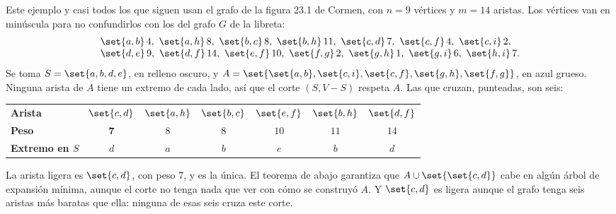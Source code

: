 \documentclass[11pt,letterpaper]{article}
\begin{document}
\begin{ejemplo}
  \label{ej:corte-cormen-mst}
  Este ejemplo y casi todos los que siguen usan el grafo de la figura
  23.1 de Cormen, con $n = 9$ vértices y $m = 14$ aristas. Los
  vértices van en minúscula para no confundirlos con los del grafo
  $G$ de la libreta:
  \[
    \begin{array}{l}
      \set{a,b}\,4,\ \set{a,h}\,8,\ \set{b,c}\,8,\ \set{b,h}\,11,\
      \set{c,d}\,7,\ \set{c,f}\,4,\ \set{c,i}\,2, \\
      \set{d,e}\,9,\ \set{d,f}\,14,\ \set{e,f}\,10,\ \set{f,g}\,2,\
      \set{g,h}\,1,\ \set{g,i}\,6,\ \set{h,i}\,7 .
    \end{array}
  \]
  Se toma $S = \set{a, b, d, e}$, en relleno oscuro, y
  $A = \set{\set{a,b}, \set{c,i}, \set{c,f}, \set{g,h}, \set{f,g}}$,
  en azul grueso. Ninguna arista de $A$ tiene un extremo de cada lado,
  así que el corte $(S, V - S)$ respeta $A$. Las que cruzan,
  punteadas, son seis:
  \begin{center}
  \small
  \begin{tabular}{lcccccc}
    \toprule
    \textbf{Arista} & $\set{c,d}$ & $\set{a,h}$ & $\set{b,c}$
      & $\set{e,f}$ & $\set{b,h}$ & $\set{d,f}$ \\
    \textbf{Peso} & $\mathbf{7}$ & $8$ & $8$ & $10$ & $11$ & $14$ \\
    \textbf{Extremo en $S$} & $d$ & $a$ & $b$ & $e$ & $b$ & $d$ \\
    \bottomrule
  \end{tabular}
  \end{center}
  La arista ligera es $\set{c, d}$, con peso $7$, y es la única. El
  teorema de abajo garantiza que $A \cup \set{\set{c, d}}$ cabe en
  algún árbol de expansión mínima, aunque el corte no tenga nada que
  ver con cómo se construyó $A$. Y $\set{c, d}$ es ligera aunque el
  grafo tenga seis aristas más baratas que ella: ninguna de esas seis
  cruza este corte.
  \begin{center}
\end{center}
\end{ejemplo}
\end{document}

